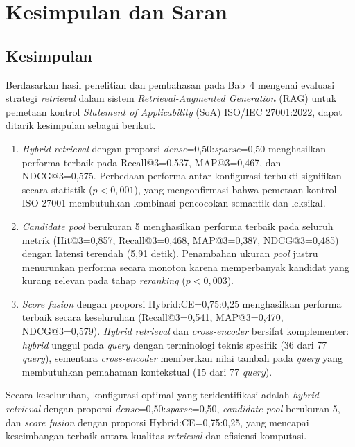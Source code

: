 \chapter{Kesimpulan dan Saran}

\section{Kesimpulan}

Berdasarkan hasil penelitian dan pembahasan pada Bab~4 mengenai evaluasi strategi \textit{retrieval} dalam sistem \textit{Retrieval-Augmented Generation} (RAG) untuk pemetaan kontrol \textit{Statement of Applicability} (SoA) ISO/IEC 27001:2022, dapat ditarik kesimpulan sebagai berikut.

\begin{enumerate}
	\item \textit{Hybrid retrieval} dengan proporsi \textit{dense}=0,50:\textit{sparse}=0,50 menghasilkan performa terbaik pada Recall@3=0,537, MAP@3=0,467, dan NDCG@3=0,575. Perbedaan performa antar konfigurasi terbukti signifikan secara statistik ($p < 0{,}001$), yang mengonfirmasi bahwa pemetaan kontrol ISO 27001 membutuhkan kombinasi pencocokan semantik dan leksikal.

	\item \textit{Candidate pool} berukuran 5 menghasilkan performa terbaik pada seluruh metrik (Hit@3=0,857, Recall@3=0,468, MAP@3=0,387, NDCG@3=0,485) dengan latensi terendah (5,91 detik). Penambahan ukuran \textit{pool} justru menurunkan performa secara monoton karena memperbanyak kandidat yang kurang relevan pada tahap \textit{reranking} ($p < 0{,}003$).

	\item \textit{Score fusion} dengan proporsi Hybrid:CE=0,75:0,25 menghasilkan performa terbaik secara keseluruhan (Recall@3=0,541, MAP@3=0,470, NDCG@3=0,579). \textit{Hybrid retrieval} dan \textit{cross-encoder} bersifat komplementer: \textit{hybrid} unggul pada \textit{query} dengan terminologi teknis spesifik (36 dari 77 \textit{query}), sementara \textit{cross-encoder} memberikan nilai tambah pada \textit{query} yang membutuhkan pemahaman kontekstual (15 dari 77 \textit{query}).
\end{enumerate}

Secara keseluruhan, konfigurasi optimal yang teridentifikasi adalah \textit{hybrid retrieval} dengan proporsi \textit{dense}=0,50:\textit{sparse}=0,50, \textit{candidate pool} berukuran 5, dan \textit{score fusion} dengan proporsi Hybrid:CE=0,75:0,25, yang mencapai keseimbangan terbaik antara kualitas \textit{retrieval} dan efisiensi komputasi.

